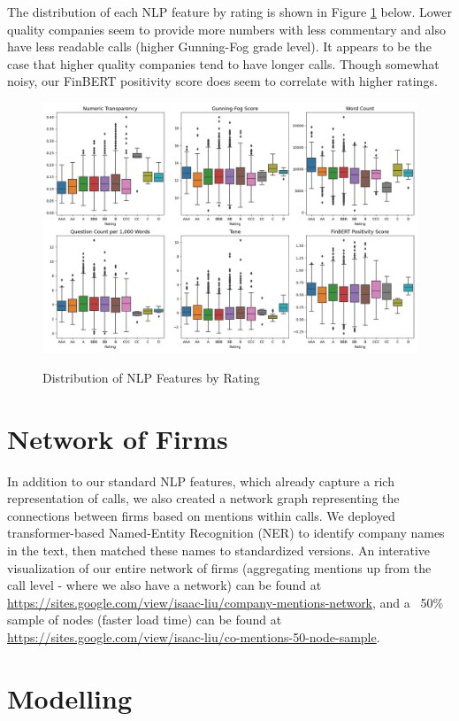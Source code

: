 \documentclass{article}[11pt]
\begin{document}
    The distribution of each NLP feature by rating is shown in Figure \ref{fig:dist-nlp-by-rating} below. Lower quality companies seem to provide more numbers with less commentary and also have less readable calls (higher Gunning-Fog grade level). It appears to be the case that higher quality companies tend to have longer calls. Though somewhat noisy, our FinBERT positivity score does seem to correlate with higher ratings.

    \begin{figure}[h!]
		\centering
        \caption{Distribution of NLP Features by Rating}
        \includegraphics[width=0.6\linewidth,keepaspectratio=true]{../Output/NLP/hist_by_rating.png}
        \label{fig:dist-nlp-by-rating}
	\end{figure}

    \section*{Network of Firms}

    In addition to our standard NLP features, which already capture a rich representation of calls, we also created a network graph representing the connections between firms based on mentions within calls. We deployed transformer-based Named-Entity Recognition (NER) \citep{spacy_spacy_2024} to identify company names in the text, then matched these names to standardized versions. An interative visualization of our entire network of firms (aggregating mentions up from the call level - where we also have a network) can be found at \url{https://sites.google.com/view/isaac-liu/company-mentions-network}, and a ~50\% sample of nodes (faster load time) can be found at \url{https://sites.google.com/view/isaac-liu/co-mentions-50-node-sample}.

    \section*{Modelling}
\end{document}
